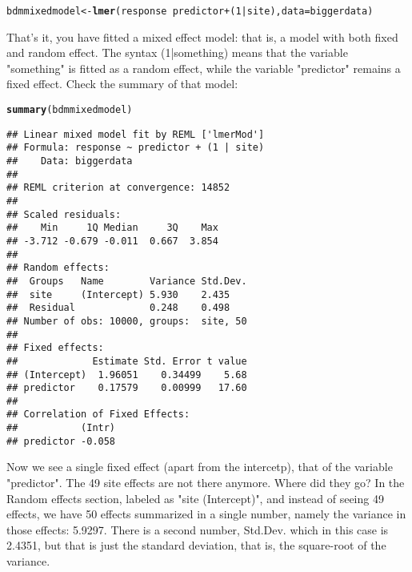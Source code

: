 \documentclass[12pt,a4paper]{scrartcl}\usepackage[]{graphicx}\usepackage[]{color}
\makeatletter
\newcommand{\hlnum}[1]{\textcolor[rgb]{0.686,0.059,0.569}{#1}}%
\newcommand{\hlopt}[1]{\textcolor[rgb]{0,0,0}{#1}}%
\newcommand{\hlstd}[1]{\textcolor[rgb]{0.345,0.345,0.345}{#1}}%
\newcommand{\hlkwb}[1]{\textcolor[rgb]{0.69,0.353,0.396}{#1}}%
\newcommand{\hlkwc}[1]{\textcolor[rgb]{0.333,0.667,0.333}{#1}}%
\newcommand{\hlkwd}[1]{\textcolor[rgb]{0.737,0.353,0.396}{\textbf{#1}}}%
\newenvironment{kframe}{%
 \def\at@end@of@kframe{}%
 \ifinner\ifhmode%
  \def\at@end@of@kframe{\end{minipage}}%
  \begin{minipage}{\columnwidth}%
 \fi\fi%
 \def\FrameCommand##1{\hskip\@totalleftmargin \hskip-\fboxsep
 \colorbox{shadecolor}{##1}\hskip-\fboxsep
     \hskip-\linewidth \hskip-\@totalleftmargin \hskip\columnwidth}%
 \MakeFramed {\advance\hsize-\width
   \@totalleftmargin\z@ \linewidth\hsize
   \@setminipage}}%
 {\par\unskip\endMakeFramed%
 \at@end@of@kframe}
\newenvironment{knitrout}{}{} %
\makeatother
\begin{document}
\begin{knitrout}
\color{fgcolor}\begin{kframe}
\begin{alltt}
\hlstd{bdmmixedmodel} \hlkwb{<-} \hlkwd{lmer}\hlstd{(response} \hlopt{~} \hlstd{predictor} \hlopt{+} \hlstd{(}\hlnum{1}\hlopt{|}\hlstd{site),} \hlkwc{data} \hlstd{= biggerdata)}
\end{alltt}
\end{kframe}
\end{knitrout}
That's it, you have fitted a mixed effect model: that is, a model with both fixed and random effect. The syntax (1|something) means that the variable "something" is fitted as a random effect, while the variable "predictor" remains a fixed effect. Check the summary of that model:
\begin{knitrout}
\color{fgcolor}\begin{kframe}
\begin{alltt}
\hlkwd{summary}\hlstd{(bdmmixedmodel)}
\end{alltt}
\begin{verbatim}
## Linear mixed model fit by REML ['lmerMod']
## Formula: response ~ predictor + (1 | site)
##    Data: biggerdata
## 
## REML criterion at convergence: 14852
## 
## Scaled residuals: 
##    Min     1Q Median     3Q    Max 
## -3.712 -0.679 -0.011  0.667  3.854 
## 
## Random effects:
##  Groups   Name        Variance Std.Dev.
##  site     (Intercept) 5.930    2.435   
##  Residual             0.248    0.498   
## Number of obs: 10000, groups:  site, 50
## 
## Fixed effects:
##             Estimate Std. Error t value
## (Intercept)  1.96051    0.34499    5.68
## predictor    0.17579    0.00999   17.60
## 
## Correlation of Fixed Effects:
##           (Intr)
## predictor -0.058
\end{verbatim}
\end{kframe}
\end{knitrout}

Now we see a single fixed effect (apart from the intercetp), that of the variable "predictor". The 49 site effects are not there anymore. Where did they go? In the Random effects section, labeled as "site (Intercept)", and instead of seeing 49 effects, we have 50 effects summarized in a single number, namely the variance in those effects: 5.9297. There is a second number, Std.Dev. which in this case is  2.4351, but that is just the standard deviation, that is, the square-root of the variance.
\end{document}
